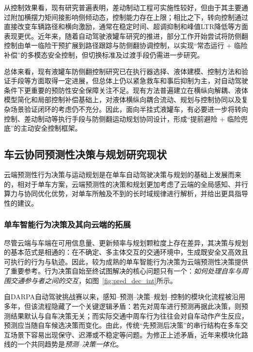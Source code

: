       从控制效果看，现有研究普遍表明，差动制动工程可实施性较好，但由于其主要通过附加横摆力矩间接影响侧倾动态，控制能力存在上限\cite{liutianfeng2024heterogeneous}；相比之下，转向控制通过直接改变车辆路径和横向激励，通常在稳定时间、超调抑制和峰值LTR降低等方面表现更优\cite{MFAC_LiXiansheng2021,zhengxuelian2019mfacpatent}。近年来，随着自动驾驶液罐车研究的推进，部分工作开始尝试将防侧翻控制由单一临险干预扩展到路径跟踪与防侧翻协调控制，以实现“常态运行 + 临险补偿”的多模态安全控制\cite{weixing2023_antirollover}，但切换标准及过渡手段仍需进一步研究。

      总体来看，现有液罐车防侧翻控制研究已在执行器选择、液体建模、控制方法和验证手段等方面取得一定进展，但总体上仍以紧急救车和事后抑制为主，对自动驾驶条件下更重要的预防性安全保障关注不足。现有方法普遍建立在横纵向解耦、液体模型简化和局部控制补偿基础上，对液体横纵向耦合流动、规划与控制协同以及复杂场景验证闭环的考虑仍不充分。因此，面向半挂式液罐车，有必要进一步将转向控制、差动制动等执行手段与防侧翻运动规划协同设计，形成“提前避险 + 临险兜底”的主动安全控制框架。




  \subsection{车云协同预测性决策与规划研究现状}

    云端预测性行为决策与运动规划是在单车自动驾驶决策与规划的基础上发展而来的，相对于单车方案，云端预测性的决策和规划更加考虑了云端的全局感知、并行算力与协同优化优势，对单车所触及不到的长时域规律进行解析，并给出更具指导性的建议。

    \subsubsection{单车智能行为决策及其向云端的拓展}
      \label{subsub:autonomous_decision}

      尽管云端与车端在可用信息量、更新频率与规划颗粒度上存在差异，其决策与规划的基本范式是相通的：在不确定、多主体交互的交通环境中，生成既安全又高效且可执行的行为与轨迹。因此，较为成熟的单车智能行为决策为云端预测性决策提供了重要参考。行为决策自始至终试图解决的核心问题只有一个：\emph{如何处理自车与周围交通参与者之间的交互}，如图~\ref{fig:pred_dec_int}所示。

      自DARPA自动驾驶挑战赛以来，感知--预测--决策--规划--控制的模块化流程被沿用多年\cite{ferguson2008urban,urmson2008boss,leonard2008perception,kammel2008annieway,vonhundelshausen2008tentacles,montemerlo2008junior,thrun2006stanley}，但该流程隐藏了一个关键逻辑矛盾：若先对周车进行预测再据此决策，则预测结果默认与自车决策无关；而实际交通中周车行为往往会对自车动作产生反应，预测应当随自车候选决策而变化。由此，传统“先预测后决策”的串行结构在多车交互场景下容易出现保守、迟滞或不稳定等问题。为修正上述矛盾，近年来模块化路线的一个共同趋势是\emph{预测--决策一体化}。
      
